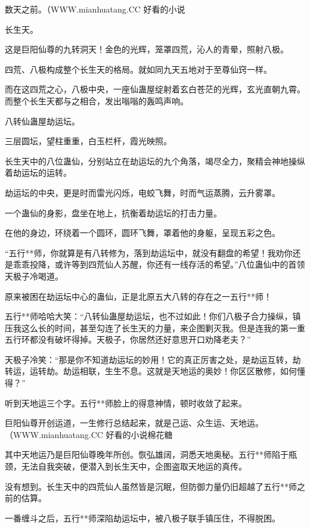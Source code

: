 
\begin{this_body}

数天之前。（WWW.mianhuatang.CC 好看的小说

长生天。

这是巨阳仙尊的九转洞天！金色的光辉，笼罩四荒，沁人的青晕，照射八极。

四荒、八极构成整个长生天的格局。就如同九天五地对于至尊仙窍一样。

而在这四荒之心，八极中央，一座仙蛊屋绽射着玄白苍茫的光辉，玄光直朝九霄。而整个长生天都与之相合，发出嗡嗡的轰鸣声响。

八转仙蛊屋劫运坛。

三层圆坛，望柱重重，白玉栏杆，霞光映照。

长生天中的八位蛊仙，分别站立在劫运坛的九个角落，竭尽全力，聚精会神地操纵着劫运坛的运转。

劫运坛的中央，更是时而雷光闪烁，电蛟飞舞，时而气运蒸腾，云升雾罩。

一个蛊仙的身影，盘坐在地上，抗衡着劫运坛的打击力量。

在他的身边，环绕着一个圆环，圆环飞舞，罩着他的身躯，呈现五彩之色。

“五行**师，你就算是有八转修为，落到劫运坛中，就没有翻盘的希望！我劝你还是乖乖投降，或许等到四荒仙人苏醒，你还有一线存活的希望。”八位蛊仙中的首领天极子冷喝道。

原来被困在劫运坛中心的蛊仙，正是北原五大八转的存在之一五行**师！

五行**师哈哈大笑：“八转仙蛊屋劫运坛，也不过如此！你们八极子合力操纵，镇压我这么长的时间，甚至勾连了长生天的力量，来企图剿灭我。但是连我的第一重五行环都没有破坏得掉。天极子，你居然还好意思开口劝降老夫？”

天极子冷笑：“那是你不知道劫运坛的妙用！它的真正厉害之处，是劫运互转，劫转运，运转劫。劫运相联，生生不息。这就是天地运的奥妙！你区区散修，如何懂得？”

听到天地运三个字。五行**师脸上的得意神情，顿时收敛了起来。

巨阳仙尊开创运道，一生修行总结起来，就是己运、众生运、天地运。（WWW.mianhuatang.CC 好看的小说棉花糖

其中天地运乃是巨阳仙尊晚年所创。恢弘雄阔，洞悉天地奥秘。五行**师陷于瓶颈，无法自我突破，便潜入到长生天中，企图盗取天地运的真传。

没有想到。长生天中的四荒仙人虽然皆是沉眠，但防御力量仍旧超越了五行**师之前的估算。

一番缠斗之后，五行**师深陷劫运坛中，被八极子联手镇压住，不得脱困。


\end{this_body}
